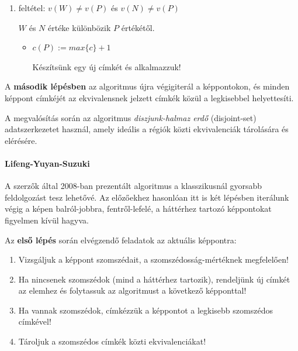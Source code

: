 \begin{enumerate}
  \item feltétel: $v(W) \neq v(P)$ és $v(N) \neq v(P)$  \\ \begin{small}$W$ és $N$ értéke különbözik $P$ értékétől.\end{small}
    \begin{itemize}
      \item $c(P) := max \lbrace c \rbrace + 1$ \\ \begin{small}Készítsünk egy új címkét és alkalmazzuk!\end{small}
    \end{itemize}

\end{enumerate}

A \textbf{második lépésben} az algoritmus újra végigiterál a képpontokon, és minden képpont címkéjét az ekvivalensnek jelzett címkék közül a legkisebbel helyettesíti.

A megvalósítás során az algoritmus \emph{diszjunk-halmaz erdő} (disjoint-set) adatszerkezetet használ, amely ideális a régiók közti ekvivalenciák tárolására és elérésére. 


\paragraph{Lifeng-Yuyan-Suzuki}

A szerzők által 2008-ban prezentált algoritmus \cite{suzuki} a klasszikusnál gyorsabb feldolgozást tesz lehetővé. Az előzőekhez hasonlóan itt is két lépésben iterálunk végig a képen balról-jobbra, fentről-lefelé, a háttérhez tartozó képpontokat figyelmen kívül hagyva.

\bigskip

Az \textbf{első lépés} során elvégzendő feladatok az aktuális képpontra:

\begin{enumerate}
  \item Vizsgáljuk a képpont szomszédait, a szomszédosság-mértéknek megfelelően!
  \item Ha nincsenek szomszédok (mind a háttérhez tartozik), rendeljünk új címkét az elemhez és folytassuk az algoritmust a következő képponttal!
  \item Ha vannak szomszédok, címkézzük a képpontot a legkisebb szomszédos címkével!
  \item Tároljuk a szomszédos címkék közti ekvivalenciákat!
\end{enumerate}

